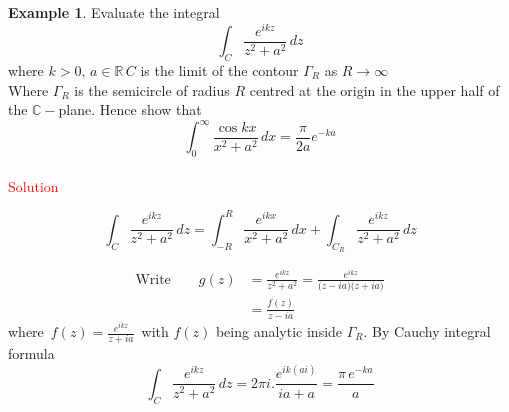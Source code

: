 \documentclass[11pt,a4paper]{article}
\theoremstyle{definition}
\newtheorem{example}[thm]{Example}
\begin{document}
\begin{example}
Evaluate the integral $$\int_C \frac{e^{ikz}}{z^2 + a^2}\,dz$$ where $k> 0, \, a\in \mathbb{R}\,C$ is the limit of the contour $\Gamma_R$ as $R\longrightarrow \infty$\\ Where $\Gamma_R$ is the semicircle of radius $R$ centred at the origin in the upper half of the $\mathbb{C}-$plane. Hence show that $$\int^{\infty}_0 \frac{\cos kx}{x^2 + a^2}\,dx = \frac{\pi}{2a}e^{-ka}$$\\




\textcolor{red}{Solution}\\


\begin{figure}[H]
\centering
{}
\end{figure}

















$$\int_C \frac{e^{ikz}}{z^2 + a^2}\,dz = \int_{-R}^R \frac{e^{ikx}}{x^2 + a^2}\,dx + \int_{C_R} \frac{e^{ikz}}{z^2 + a^2}\,dz$$

\begin{align*}
\text{Write}\qquad  g(z) & = \frac{e^{ikz}}{z^2 + a^2} = \frac{e^{ikz}}{\big(z - ia\big)\big(z + ia\big)}\\
& = \frac{f(z)}{z - ia}
\end{align*}
where $\,f(z) = \frac{e^{ikz}}{z + ia}\,$ with $f(z)$ being analytic inside $\Gamma_R$. By Cauchy integral formula
$$\int_C \frac{e^{ikz}}{z^2 + a^2}\,dz = 2\pi i . \frac{e^{ik(ai)}}{ia + a} = \frac{\pi \,e^{-ka}}{a}$$\\




\end{example}
\end{document}
